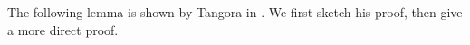 \documentclass[psamsfonts]{amsart}
\newtheorem{lem}[thm]{Lemma}
\theoremstyle{definition}
\newtheorem{rem}[thm]{Remark}
\numberwithin{equation}{section}
\begin{document}










The following lemma is shown by Tangora in \cite{Tan}. We first sketch his proof, then give a more direct proof.
\end{document}

